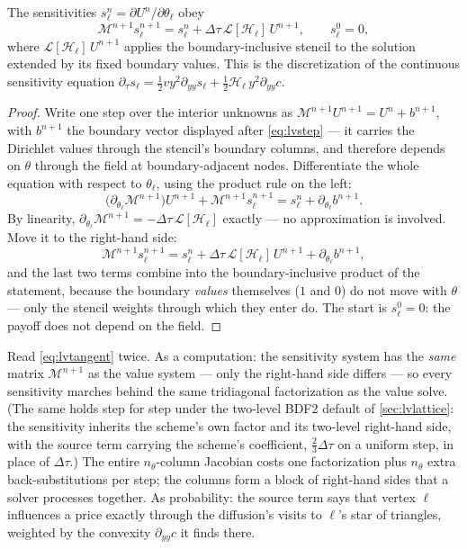 \begin{proposition}
\label{prop:lvtangent}
The sensitivities $s^{n}_\ell=\partial U^{n}/\partial\theta_\ell$ obey
\begin{equation}
\mathcal M^{n+1}s^{n+1}_\ell
=s^{n}_\ell+\Delta\tau\,\mathcal L[\mathcal H_\ell]\,U^{n+1},
\qquad s^{0}_\ell=0,
\label{eq:lvtangent}
\end{equation}
where $\mathcal L[\mathcal H_\ell]\,U^{n+1}$ applies the boundary-inclusive
stencil to the solution extended by its fixed boundary values.  This is the
discretization of the continuous sensitivity equation
$\partial_\tau s_\ell=\tfrac12 v y^{2}\partial_{yy}s_\ell
+\tfrac12\mathcal H_\ell\,y^{2}\partial_{yy}c$.
\end{proposition}

\begin{proof}
Write one step over the interior unknowns as
$\mathcal M^{n+1}U^{n+1}=U^{n}+b^{n+1}$, with $b^{n+1}$ the boundary
vector displayed after \eqref{eq:lvstep} --- it carries the
Dirichlet values through the stencil's boundary columns, and
therefore depends on $\theta$ through the field at boundary-adjacent
nodes.  Differentiate the whole equation with respect to
$\theta_\ell$, using the product rule on the left:
\[
\Big(\partial_{\theta_\ell}\mathcal M^{n+1}\Big)U^{n+1}
+\mathcal M^{n+1}s^{n+1}_\ell
=s^{n}_\ell+\partial_{\theta_\ell}b^{n+1}.
\]
By linearity,
$\partial_{\theta_\ell}\mathcal M^{n+1}
=-\Delta\tau\,\mathcal L[\mathcal H_\ell]$ exactly --- no
approximation is involved.  Move it to the right-hand side:
\[
\mathcal M^{n+1}s^{n+1}_\ell
=s^{n}_\ell
+\Delta\tau\,\mathcal L[\mathcal H_\ell]\,U^{n+1}
+\partial_{\theta_\ell}b^{n+1},
\]
and the last two terms combine into the boundary-inclusive product of
the statement, because the boundary \emph{values} themselves ($1$ and
$0$) do not move with $\theta$ --- only the stencil weights through
which they enter do.  The start is $s^{0}_\ell=0$: the payoff does not
depend on the field.
\end{proof}

Read \eqref{eq:lvtangent} twice.  As a computation: the sensitivity
system has the \emph{same} matrix $\mathcal M^{n+1}$ as the value
system --- only the right-hand side differs --- so every sensitivity
marches behind the same tridiagonal factorization as the value solve.
(The same holds step for step under the two-level BDF2 default of
\cref{sec:lvlattice}: the sensitivity inherits the scheme's own
factor and its two-level right-hand side, with the source term
carrying the scheme's coefficient, $\tfrac23\Delta\tau$ on a uniform
step, in place of $\Delta\tau$.)
The entire $n_\theta$-column Jacobian costs one factorization plus
$n_\theta$ extra back-substitutions per step; the columns form a block
of right-hand sides that a solver processes together.  As probability:
the source term says that vertex $\ell$ influences a price exactly
through the diffusion's visits to $\ell$'s star of triangles, weighted
by the convexity $\partial_{yy}c$ it finds there.

